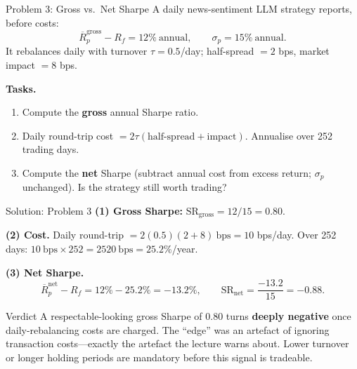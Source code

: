 \documentclass[9pt,t]{beamer}
\begin{document}
\begin{frame}{Problem 3: Gross vs.\ Net Sharpe}
A daily news-sentiment LLM strategy reports, before costs:
\[
  \overline{R}^{\text{gross}}_p - R_f = 12\%\ \text{annual},\qquad
  \sigma_p = 15\%\ \text{annual}.
\]
It rebalances daily with turnover $\tau = 0.5$/day; half-spread $= 2$ bps,
market impact $= 8$ bps.

\medskip
\textbf{Tasks.}
\begin{enumerate}
  \item Compute the \textbf{gross} annual Sharpe ratio.
  \item Daily round-trip cost $= 2\tau(\text{half-spread}+\text{impact})$.
        Annualise over 252 trading days.
  \item Compute the \textbf{net} Sharpe (subtract annual cost from excess return;
        $\sigma_p$ unchanged). Is the strategy still worth trading?
\end{enumerate}
\end{frame}

\begin{frame}{Solution: Problem 3}
\textbf{(1) Gross Sharpe:} $\text{SR}_{\text{gross}} = 12/15 = \mathbf{0.80}$.

\medskip
\textbf{(2) Cost.} Daily round-trip $= 2(0.5)(2+8)\ \text{bps} = 10$ bps/day.
Over 252 days: $10\ \text{bps}\times 252 = 2520\ \text{bps} = \mathbf{25.2\%}$/year.

\medskip
\textbf{(3) Net Sharpe.}
\[
  \overline{R}^{\text{net}}_p - R_f = 12\% - 25.2\% = -13.2\%,
  \qquad
  \text{SR}_{\text{net}} = \frac{-13.2}{15} = \mathbf{-0.88}.
\]

\medskip
\begin{alertblock}{Verdict}
A respectable-looking gross Sharpe of 0.80 turns \textbf{deeply negative} once
daily-rebalancing costs are charged. The ``edge'' was an artefact of ignoring
transaction costs---exactly the artefact the lecture warns about. Lower turnover
or longer holding periods are mandatory before this signal is tradeable.
\end{alertblock}
\end{frame}
\end{document}

